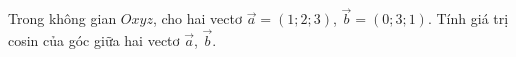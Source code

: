 \begin{ex}
Trong không gian $Oxyz$, cho hai vectơ $\vec a=(1;2;3)$, $\vec b=(0;3;1)$. Tính giá trị cosin của góc giữa hai vectơ $\vec a$, $\vec b$.
\end{ex}
